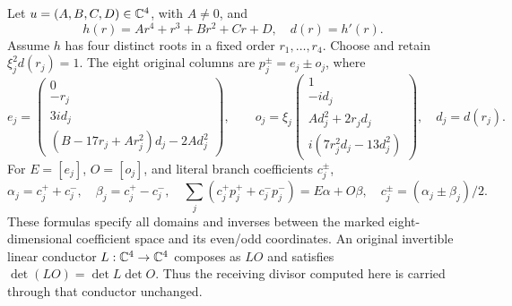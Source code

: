 \documentclass[11pt]{article}
\begin{document}
Let $u=(A,B,C,D)\in\mathbb C^4$, with $A\ne0$, and
\begin{equation}
 h(r)=Ar^4+r^3+Br^2+Cr+D,\quad d(r)=h'(r).
 \tag{OF1}
\end{equation}
Assume $h$ has four distinct roots in a fixed order $r_1,\ldots,r_4$.
Choose and retain $\xi_j^2d(r_j)=1$. The eight original columns are
$p_j^\pm=e_j\pm o_j$, where
\begin{equation}
 e_j=\begin{pmatrix}0\\-r_j\\3i d_j\\
 (B-17r_j+Ar_j^2)d_j-2Ad_j^2\end{pmatrix},\qquad
 o_j=\xi_j\begin{pmatrix}1\\-id_j\\Ad_j^2+2r_jd_j\\
 i(7r_j^2d_j-13d_j^2)\end{pmatrix},\quad d_j=d(r_j).
 \tag{OF2}
\end{equation}
For $E=[e_j]$, $O=[o_j]$, and literal branch coefficients $c_j^\pm$,
\begin{equation}
 \alpha_j=c_j^++c_j^-,\quad\beta_j=c_j^+-c_j^-,\quad
 \sum_j(c_j^+p_j^++c_j^-p_j^-)=E\alpha+O\beta,\quad
 c_j^\pm=(\alpha_j\pm\beta_j)/2.\tag{OF3}
\end{equation}
These formulas specify all domains and inverses between the marked
eight-dimensional coefficient space and its even/odd coordinates.
An original invertible linear conductor $L:\mathbb C^4\to\mathbb C^4$ composes
as $LO$ and satisfies $\det(LO)=\det L\det O$. Thus the receiving
divisor computed here is carried through that conductor unchanged.
\end{document}
